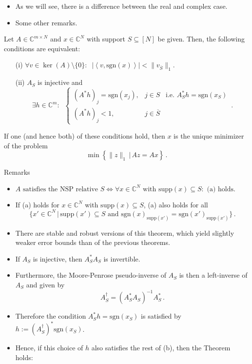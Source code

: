 \documentclass[11pt]{beamer}
\newcommand{\CC}{\mathbb{C}}
\newcommand{\sgn}{\text{sgn}}
\newcommand{\p}[2]{\left\langle #1,#2\right\rangle}
\newcommand{\supp}{\text{supp}}
\begin{document}
\begin{frame}
\begin{itemize}
	\item As we will see, there is a difference between the real and complex case.
	\item Some other remarks.
\end{itemize}

\end{frame}

\begin{frame}
	\begin{Satzz}
		{}{} Let \(A\in\CC^{m\times N}\) and \(x\in\CC^N\) with support \(S\subseteq[N]\) be given. Then, the following conditions are equivalent:
		\begin{itemize}
			\item[(i)] \(\forall v\in \ker(A)\setminus\{0\}:\;\;|\p{v}{\sgn(x)}|< \|v_{\overline S}\|_1\).
			\item[(ii)] \(A_S\) is injective and 
			\[\exists h\in \CC^m:\;\;\left\{\begin{array}{cl}
				(A^*h)_j=\sgn(x_j),&j\in S\;\;\;\text{i.e. }A^*_Sh=\sgn(x_S)\\
				(A^*h)_j<1,&j\in \overline S
			\end{array}\right.\,.\]
			\end{itemize}
			If one (and hence both) of these conditions hold, then \(x\) is the unique minimizer of the problem
			\[\min\left\{\|z\|_1\,\big|\,Az=Ax\right\}\,.\]
	\end{Satzz}
	
\end{frame}

\begin{frame}{Remarks}
	\begin{itemize}
		\item \(A\text{ satisfies the NSP relative }S\iff \forall x\in \CC^N \text{ with }\supp(x)\subseteq S:\text{ (a) holds}.\)
		\item If (a) holds for \(x\in \CC^N \) with \(\supp(x)\subseteq S\), (a) also holds for all 
		\[\{x'\in \CC^N\,|\, \supp (x') \subseteq S\text{ and }\sgn(x)_{\supp(x')}=\sgn(x')_{\supp(x')}\}\,.\]
		\item There are stable and robust versions of this theorem, which yield slightly weaker error bounds than of the previous theorems.
	\end{itemize}
\end{frame}

\begin{frame}
	\begin{itemize}
		\item If \(A_S \) is injective, then \(A_S^*A_S\) is invertible.
		\item Furthermore, the Moore-Penrose pseudo-inverse of \(A_S\) is then a left-inverse of \(A_S\) and given by
		\[A_S^{\dagger}=(A_S^*A_S)^{-1}A_S^*\,.\]
		\item Therefore the condition \(A^*_Sh=\sgn(x_S)\) is satisfied by \(h:=(A_S^{\dagger})^*\sgn(x_S)\).
		\item Hence, if this choice of \(h\) also satisfies the rest of (b), then the Theorem holds:
	\end{itemize}
\end{frame}
\end{document}
